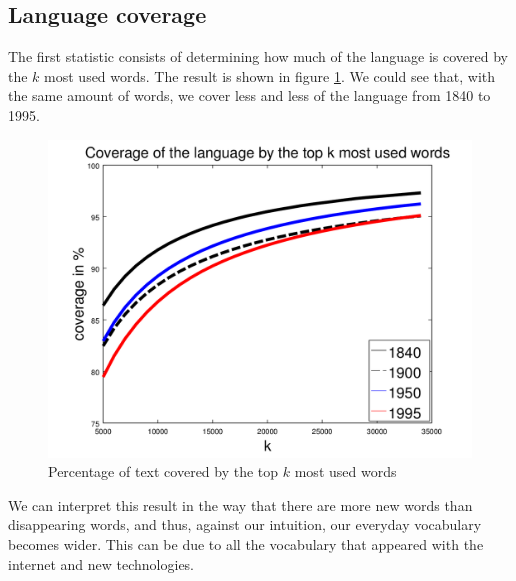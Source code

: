 \subsection{Language coverage}

The first statistic consists of determining how much of the language is covered by the $k$ most used words. The result is shown in figure \ref{coverage_figure}. We could see that, with the same amount of words, we cover less and less of the language from 1840 to 1995.

\begin{figure}[H]
	\centering
    \includegraphics[scale=0.50]{Pictures/statistics/top-k-words-coverage/coverage.png}
    \caption{Percentage of text covered by the top $k$ most used words}
    \label{coverage_figure}
\end{figure}

We can interpret this result in the way that there are more new words than disappearing words, and thus, against our intuition, our everyday vocabulary becomes wider. This can be due to all the vocabulary that appeared with the internet and new technologies.
